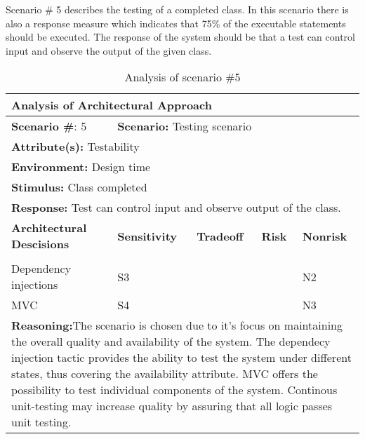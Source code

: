 \clearpage
Scenario \# 5 describes the testing of a completed class. In this scenario there is also a response measure which indicates that 75\% of the executable statements should be executed.
The response of the system should be that a test can control input and observe the output of the given class.
\begin{table}[h]
  \begin{tabularx}{400pt}{|l|l|l|l|l|}
    \hline
    \multicolumn{5}{|l|}{\textbf{Analysis of Architectural Approach}}\\
    \hline
    \multicolumn{1}{|l|}{\textbf{Scenario \#}: 5} & \multicolumn{4}{|l|}{\textbf{Scenario:} Testing scenario} \\
    \hline
    \multicolumn{5}{|l|}{\textbf{Attribute(s):} Testability} \\
    \hline
    \multicolumn{5}{|l|}{\textbf{Environment:} Design time} \\
    \hline
    \multicolumn{5}{|l|}{\textbf{Stimulus:} Class completed} \\
    \hline
    \multicolumn{5}{|l|}{\textbf{Response:} Test can control input and observe output of the class.} \\
    \hline
    \textbf{Architectural Descisions} & \textbf{Sensitivity} & \textbf{Tradeoff} & \textbf{Risk} & \textbf{Nonrisk}\\
     & & & & \\
    \hline 
    Dependency injections & S3 & & & N2  \\
    \hline
    MVC & S4 & & & N3 \\
    \hline
    \multicolumn{5}{|X|}{\textbf{Reasoning:}The scenario is chosen due to it's focus on maintaining the overall quality and availability of the system. The dependecy injection tactic provides the ability to test the system under different states, thus covering the availability attribute.
    MVC offers the possibility to test individual components of the system. Continous unit-testing may increase quality by assuring that all logic passes unit testing.} \\
    \hline
  \end{tabularx}
  \caption{Analysis of scenario \#5}
\end{table}

